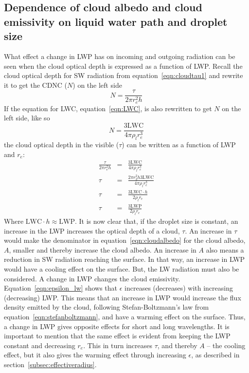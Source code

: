 \subsection{Dependence of cloud albedo and cloud emissivity on liquid water path and droplet size}
\label{subsec:dependalbeps}
What effect a change in LWP has on incoming and outgoing radiation can be seen when the cloud optical depth is expressed as a function of LWP. Recall the cloud optical depth for SW radiation from equation~\ref{eqn:cloudtau1} and rewrite it to get the CDNC ($N$) on the left side
\begin{equation}
N = \frac{\tau}{2\pi r^2_e h}
\end{equation}
If the equation for LWC, equation~\ref{eqn:LWC}, is also rewritten to get $N$ on the left side, like so
\begin{equation}
N = \frac{3\text{LWC}}{4\pi \rho_l r^3_e}
\end{equation}
the cloud optical depth in the visible ($\tau$) can be written as a function of LWP and $r_e$:
\begin{eqnarray}
\frac{\tau}{2\pi r^2_e h} &=& \frac{3\text{LWC}}{4\pi \rho_l r^3_e}\\
\tau &=& \frac{2\pi r^2_3 h 3\text{LWC}}{4\pi \rho_l r^3_e}\\
\tau &=& \frac{3\text{LWC}\cdot h}{2\rho_l r_e}\\
\tau &=& \frac{3\text{LWP}}{2\rho_l r_e}
\label{eqn:cloudtau}
\end{eqnarray}
Where $\text{LWC}\cdot h \approx \text{LWP}$. It is now clear that, if the droplet size is constant, an increase in the LWP increases the optical depth of a cloud, $\tau$. An increase in $\tau$ would make the denominator in equation~\ref{eqn:cloudalbedo} for the cloud albedo, $A$, smaller and thereby increase the cloud albedo. An increase in $A$ also means a reduction in SW radiation reaching the surface. In that way, an increase in LWP would have a cooling effect on the surface. 
But, the LW radiation must also be considered. A change in LWP changes the cloud emissivity. Equation~\ref{eqn:epsilon_lw} shows that $\epsilon$ increases (decreases) with increasing (decreasing) LWP. This means that an increase in LWP would increase the flux density emitted by the cloud, following Stefan-Boltzmann's law from equation~\ref{eqn:stefanboltzmann}, and have a warming effect on the surface. Thus, a change in LWP gives opposite effects for short and long wavelengths. It is important to mention that the same effect is evident from keeping the LWP constant and decreasing $r_e$. This in turn increases $\tau$, and thereby $A$ -- the cooling effect, but it also gives the warming effect through increasing $\epsilon$, as described in section~\ref{subsec:effectiveradius}.

